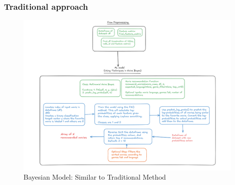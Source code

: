 \documentclass[a4paper]{article}
\theoremstyle{plain}
\begin{document}
\subsubsection{Traditional approach}
\begin{figure}[H]
    \centering
    \includegraphics[width=\linewidth]{bayestrad.png}
    \caption{Bayesian Model: Similar to Traditional Method}
    \label{fig:bayesian}
\end{figure}
\end{document}
